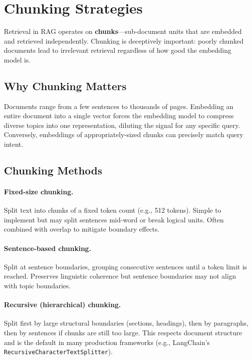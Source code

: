 \section{Chunking Strategies}
\label{sec:chunking}

Retrieval in RAG operates on \textbf{chunks}---sub-document units that are
embedded and retrieved independently.  Chunking is deceptively important:
poorly chunked documents lead to irrelevant retrieval regardless of how good
the embedding model is.

\subsection{Why Chunking Matters}

Documents range from a few sentences to thousands of pages.  Embedding an
entire document into a single vector forces the embedding model to compress
diverse topics into one representation, diluting the signal for any specific
query.  Conversely, embeddings of appropriately-sized chunks can precisely
match query intent.

\subsection{Chunking Methods}

\paragraph{Fixed-size chunking.}
Split text into chunks of a fixed token count (e.g., 512 tokens).  Simple to
implement but may split sentences mid-word or break logical units.  Often
combined with overlap to mitigate boundary effects.

\paragraph{Sentence-based chunking.}
Split at sentence boundaries, grouping consecutive sentences until a token
limit is reached.  Preserves linguistic coherence but sentence boundaries may
not align with topic boundaries.

\paragraph{Recursive (hierarchical) chunking.}
Split first by large structural boundaries (sections, headings), then by
paragraphs, then by sentences if chunks are still too large.  This respects
document structure and is the default in many production frameworks
(e.g., LangChain's \texttt{RecursiveCharacterTextSplitter}).


